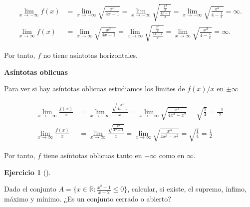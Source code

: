 \documentclass[
  a4paper,
]{scrreport}
\theoremstyle{definition}
\newtheorem{exercise}{Ejercicio}[chapter]
\theoremstyle{remark}
\begin{document}
\begin{tcolorbox}
\begin{align*}
\lim_{x\to-\infty}f(x) &=  \lim_{x\to-\infty} \sqrt{\frac{x^3}{4x-1}} = \lim_{x\to-\infty} \sqrt{\frac{\frac{x^3}{x}}{\frac{4x-1}{x}}} = \lim_{x\to-\infty} \sqrt{\frac{x^2}{4-\frac{1}{x}}} = \infty.\\
\lim_{x\to\infty}f(x) &=  \lim_{x\to\infty} \sqrt{\frac{x^3}{4x-1}} = \lim_{x\to\infty} \sqrt{\frac{\frac{x^3}{x}}{\frac{4x-1}{x}}} = \lim_{x\to\infty} \sqrt{\frac{x^2}{4-\frac{1}{x}}} = \infty.
\end{align*}

Por tanto, \(f\) no tiene asíntotas horizontales.

\textbf{Asíntotas oblicuas}

Para ver si hay asíntotas oblicuas estudiamos los límites de \(f(x)/x\)
en \(\pm\infty\)

\begin{align*}
\lim_{x\to-\infty}\frac{f(x)}{x} &=  \lim_{x\to-\infty} \frac{\sqrt{\frac{x^3}{4x-1}}}{x} = \lim_{x\to-\infty} \sqrt{\frac{x^3}{4x^3-x^2}} = \sqrt{\frac{1}{4}} = \frac{-1}{2}\\
\lim_{x\to\infty}\frac{f(x)}{x} &=  \lim_{x\to\infty} \frac{\sqrt{\frac{x^3}{4x-1}}}{x} = \lim_{x\to\infty} \sqrt{\frac{x^3}{4x^3-x^2}} = \sqrt{\frac{1}{4}} = \frac{1}{2}
\end{align*}

Por tanto, \(f\) tiene asíntotas oblicuas tanto en \(-\infty\) como en
\(\infty\).

\end{tcolorbox}

\leavevmode{}%
\begin{exercise}[]\label{exr-5}

Dado el conjunto \(A=\{x\in\mathbb{R} : \frac{x^2-1}{x-2}\leq 0\}\),
calcular, si existe, el supremo, ínfimo, máximo y mínimo. ¿Es un
conjunto cerrado o abierto?

\end{exercise}
\end{document}
